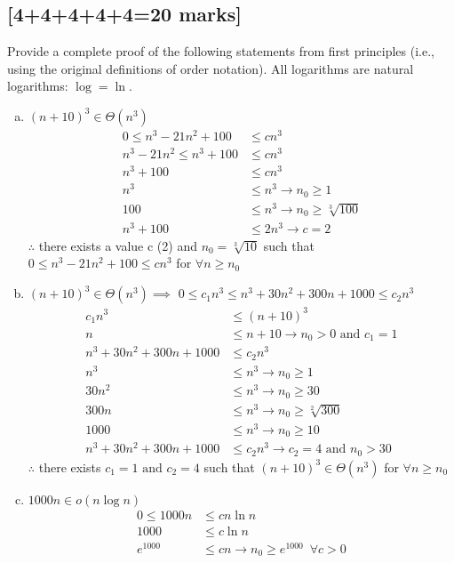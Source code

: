 \documentclass[12pt]{article}
\begin{document}
\subsection{[4+4+4+4+4=20 marks]}
Provide a complete proof of the following statements from first principles
(i.e., using the original definitions of order notation).  All logarithms
are natural logarithms: $\log = \ln$.
\begin{enumerate}[(a)]
\item $ (n + 10)^3 \in \Theta(n^3) $
\begin{align*}
0\leq n^3 - 21n^2 +100 &\leq cn^3\\
n^3 - 21n^2 \leq n^3 + 100 &\leq cn^3\\ 
n^3 + 100 &\leq cn^3\\
n^3 &\leq n^3 \rightarrow n_{0} \geq 1\\
100 &\leq n^3 \rightarrow n_{0} \geq \sqrt[3]{100}\\
n^3 + 100 &\leq 2n^3 \rightarrow c = 2
\end{align*}
$\therefore$ there exists a value c (2) and $n_{0} = \sqrt[3]{10}$ such that $0\leq n^3 - 21n^2 +100 \leq cn^3$ for $\forall n \geq n_{0}$
\item $ (n + 10)^3 \in \Theta(n^3) \implies $
$0\leq c_{1}n^3 \leq n^3 + 30n^2 + 300n + 1000 \leq c_{2}n^3$ \\
\begin{align*}
c_{1}n^3 &\leq (n+10)^3 \\
n &\leq n + 10 \rightarrow n_{0} > 0 \text{ and } c_{1} = 1 \\
n^3 + 30n^2 + 300n + 1000 &\leq c_{2}n^3\\
n^3 &\leq n^3 \rightarrow n_{0} \geq 1\\
30n^2 &\leq n^3 \rightarrow n_{0} \geq 30\\
300n &\leq n^3 \rightarrow n_{0} \geq \sqrt[2]{300}\\
1000 &\leq n^3 \rightarrow n_{0} \geq 10\\
n^3 + 30n^2 + 300n + 1000 &\leq c_{2}n^3 \rightarrow c_{2} = 4 \text{ and } n_{0}>30
\end{align*}
$\therefore$ there exists $c_{1} = 1 \text{ and } c_{2} = 4$ such that $(n+10)^3 \in \Theta (n^3)$ for $\forall n \geq n_{0}$
\item $1000n \in o(n \log n)$
\begin{align*}
0 \leq 1000n &\leq cn \ln n \\
1000 &\leq c\ln n \\
e^{1000} &\leq cn \rightarrow n_{0} \geq e^{1000} \enspace \forall c > 0

\end{align*}
\end{enumerate}
\end{document}
